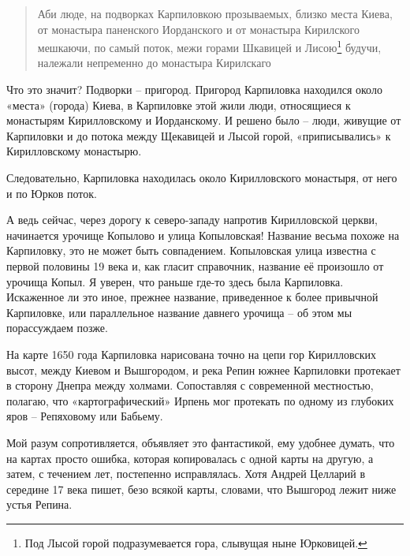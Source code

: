 \begin{quotation}
Аби люде, на подворках Карпиловкою прозываемых, близко места Киева, от монастыра паненского Иорданского и от монастыра Кирилского мешкаючи, по самый поток, межи горами Шкавицей и Лисою\footnote{Под Лысой горой подразумевается гора, слывущая ныне Юрковицей.} будучи, належали непременно до монастыра Кирилскаго
\end{quotation}

Что это значит? Подворки – пригород. Пригород Карпиловка находился около «места» (города) Киева, в Карпиловке этой жили люди, относящиеся к монастырям Кирилловскому и Иорданскому. И решено было – люди, живущие от Карпиловки и до потока между Щекавицей и Лысой горой, «приписывались» к Кирилловскому монастырю. 

Следовательно, Карпиловка находилась около Кирилловского монастыря, от него и по Юрков поток. 

А ведь сейчас, через дорогу к севе\-ро-западу напротив Кирилловской церкви, начинается урочище Копылово и улица Копыловская! Название весьма похоже на Карпиловку, это не может быть совпадением. Копыловская улица известна с первой половины 19 века и, как гласит справочник, название её произошло от урочища Копыл. Я уверен, что раньше где-то здесь была Карпиловка. Искаженное ли это иное, прежнее название, приведенное к более привычной Карпиловке, или параллельное название давнего урочища – об этом мы порассуждаем позже.

На карте 1650 года Карпиловка нарисована точно на цепи гор Кирилловских высот, между Киевом и Вышгородом, и река Репин южнее Карпиловки протекает в сторону Днепра между холмами. Сопоставляя с современной местностью, полагаю, что «картографический» Ирпень мог протекать по одному из глубоких яров – Репяховому или Бабьему.

Мой разум сопротивляется, объявляет это фантастикой, ему удобнее думать, что на картах просто ошибка, которая копировалась с одной карты на другую, а затем, с течением лет, постепенно исправлялась. Хотя Андрей Целларий\cite{sbornikmat} в середине 17 века пишет, безо всякой карты, словами, что Вышгород лежит ниже устья Репина.

